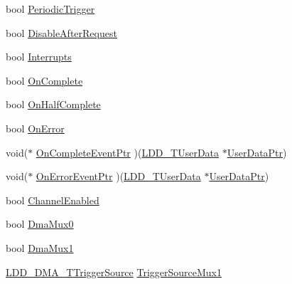 \begin{DoxyCompactItemize}
\item 
bool \hyperlink{struct_l_d_d___d_m_a___t_transfer_descriptor_aa29036eb34e794f3abbfea02be51711f}{Periodic\+Trigger}
\item 
bool \hyperlink{struct_l_d_d___d_m_a___t_transfer_descriptor_af47462df9934c927bd3cb1c8c7a4aa94}{Disable\+After\+Request}
\item 
bool \hyperlink{struct_l_d_d___d_m_a___t_transfer_descriptor_a2dd483b9c7608a34cc231114f2642271}{Interrupts}
\item 
bool \hyperlink{struct_l_d_d___d_m_a___t_transfer_descriptor_a1b9c560066718de0c2e9b5e0c6b2a3c5}{On\+Complete}
\item 
bool \hyperlink{struct_l_d_d___d_m_a___t_transfer_descriptor_a27b37f43ef69a8644ec04166660a7c24}{On\+Half\+Complete}
\item 
bool \hyperlink{struct_l_d_d___d_m_a___t_transfer_descriptor_a3ddeb9c7243015b0ee7afd15235ce37b}{On\+Error}
\item 
void($\ast$ \hyperlink{struct_l_d_d___d_m_a___t_transfer_descriptor_a7a3c1cd12b7f66760b5d02989409ac48}{On\+Complete\+Event\+Ptr} )(\hyperlink{group___p_e___types__module_ga0b66a73f87238a782318aa0be7578e35}{L\+D\+D\+\_\+\+T\+User\+Data} $\ast$\hyperlink{struct_l_d_d___d_m_a___t_transfer_descriptor_a4136d6742944c7b04a94695c78b581b8}{User\+Data\+Ptr})
\item 
void($\ast$ \hyperlink{struct_l_d_d___d_m_a___t_transfer_descriptor_a9d97c36a86505594fd2642c1242f7460}{On\+Error\+Event\+Ptr} )(\hyperlink{group___p_e___types__module_ga0b66a73f87238a782318aa0be7578e35}{L\+D\+D\+\_\+\+T\+User\+Data} $\ast$\hyperlink{struct_l_d_d___d_m_a___t_transfer_descriptor_a4136d6742944c7b04a94695c78b581b8}{User\+Data\+Ptr})
\item 
bool \hyperlink{struct_l_d_d___d_m_a___t_transfer_descriptor_acf5f8fe95f319b19a591880ed8a7a3c0}{Channel\+Enabled}
\item 
bool \hyperlink{struct_l_d_d___d_m_a___t_transfer_descriptor_a2f0b8713587bb922b1f8743a52473ff6}{Dma\+Mux0}
\item 
bool \hyperlink{struct_l_d_d___d_m_a___t_transfer_descriptor_a3bddfb1f8217b18925521909612307db}{Dma\+Mux1}
\item 
\hyperlink{group___p_e___types__module_ga8af21cbad27c8d061a98924a11fc5a9b}{L\+D\+D\+\_\+\+D\+M\+A\+\_\+\+T\+Trigger\+Source} \hyperlink{struct_l_d_d___d_m_a___t_transfer_descriptor_a6a9913a5c4727f786339ed8e84e8d5de}{Trigger\+Source\+Mux1}
\end{DoxyCompactItemize}


